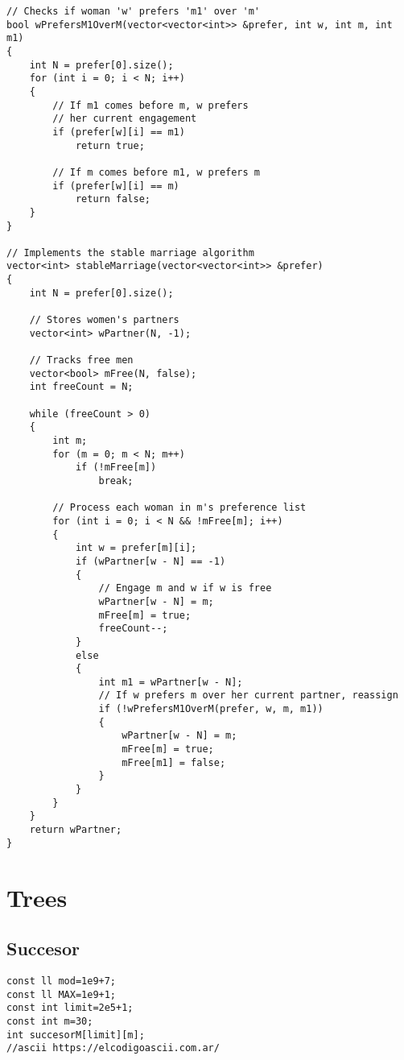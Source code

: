 \documentclass[10pt]{article}
\begin{document}
\begin{multicols*}{2}
\begin{lstlisting}[style=compactcpp]
// Checks if woman 'w' prefers 'm1' over 'm'
bool wPrefersM1OverM(vector<vector<int>> &prefer, int w, int m, int m1)
{
    int N = prefer[0].size();
    for (int i = 0; i < N; i++)
    {
        // If m1 comes before m, w prefers
        // her current engagement
        if (prefer[w][i] == m1)
            return true;

        // If m comes before m1, w prefers m
        if (prefer[w][i] == m)
            return false;
    }
}

// Implements the stable marriage algorithm
vector<int> stableMarriage(vector<vector<int>> &prefer)
{
    int N = prefer[0].size();

    // Stores women's partners
    vector<int> wPartner(N, -1);

    // Tracks free men
    vector<bool> mFree(N, false);
    int freeCount = N;

    while (freeCount > 0)
    {
        int m;
        for (m = 0; m < N; m++)
            if (!mFree[m])
                break;

        // Process each woman in m's preference list
        for (int i = 0; i < N && !mFree[m]; i++)
        {
            int w = prefer[m][i];
            if (wPartner[w - N] == -1)
            {
                // Engage m and w if w is free
                wPartner[w - N] = m;
                mFree[m] = true;
                freeCount--;
            }
            else
            {
                int m1 = wPartner[w - N];
                // If w prefers m over her current partner, reassign
                if (!wPrefersM1OverM(prefer, w, m, m1))
                {
                    wPartner[w - N] = m;
                    mFree[m] = true;
                    mFree[m1] = false;
                }
            }
        }
    }
    return wPartner;
}
\end{lstlisting}

\section{Trees}

\subsection{Succesor}

\begin{lstlisting}[style=compactcpp]
const ll mod=1e9+7;
const ll MAX=1e9+1;
const int limit=2e5+1;
const int m=30;
int succesorM[limit][m];
//ascii https://elcodigoascii.com.ar/


\end{lstlisting}
\end{multicols*}
\end{document}
